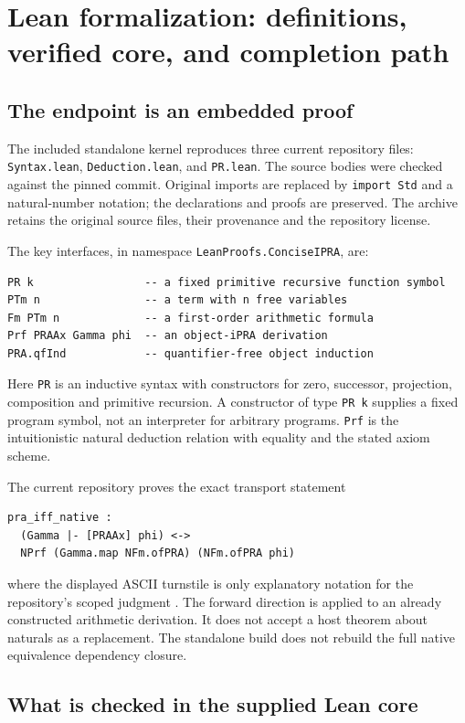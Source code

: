 \section{Lean formalization: definitions, verified core, and completion path}
\label{sec:formalization}

\subsection{The endpoint is an embedded proof}

The included standalone kernel reproduces three current repository files:
\texttt{Syntax.lean}, \texttt{Deduction.lean}, and \texttt{PR.lean}.
The source bodies were checked against the pinned commit. Original imports
are replaced by \texttt{import Std} and a natural-number notation; the
declarations and proofs are preserved. The archive retains the original
source files, their provenance and the repository license.

The key interfaces, in namespace \texttt{LeanProofs.ConciseIPRA}, are:
\begin{lstlisting}
PR k                 -- a fixed primitive recursive function symbol
PTm n                -- a term with n free variables
Fm PTm n             -- a first-order arithmetic formula
Prf PRAAx Gamma phi  -- an object-iPRA derivation
PRA.qfInd            -- quantifier-free object induction
\end{lstlisting}
Here \texttt{PR} is an inductive syntax with constructors for zero,
successor, projection, composition and primitive recursion. A constructor
of type \texttt{PR k} supplies a fixed program symbol, not an interpreter
for arbitrary programs. \texttt{Prf} is the intuitionistic natural
deduction relation with equality and the stated axiom scheme.

The current repository proves the exact transport statement
\begin{lstlisting}
pra_iff_native :
  (Gamma |- [PRAAx] phi) <->
  NPrf (Gamma.map NFm.ofPRA) (NFm.ofPRA phi)
\end{lstlisting}
where the displayed ASCII turnstile is only explanatory notation for
the repository's scoped judgment \cite{repoBridge}. The forward direction
is applied to an already constructed arithmetic derivation. It does not
accept a host theorem about naturals as a replacement. The standalone
build does not rebuild the full native equivalence dependency closure.

\subsection{What is checked in the supplied Lean core}

